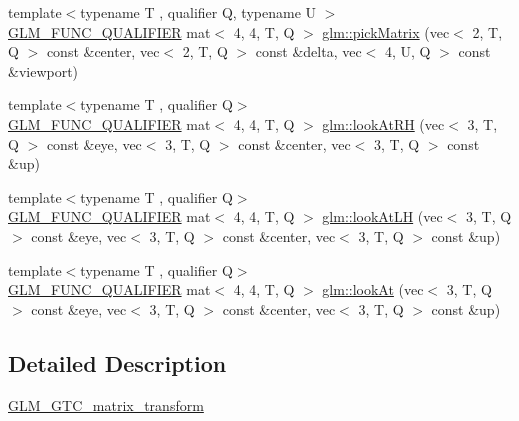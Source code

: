 \begin{DoxyCompactItemize}
\item 
{\footnotesize template$<$typename T , qualifier Q, typename U $>$ }\\\mbox{\hyperlink{setup_8hpp_a33fdea6f91c5f834105f7415e2a64407}{G\+L\+M\+\_\+\+F\+U\+N\+C\+\_\+\+Q\+U\+A\+L\+I\+F\+I\+ER}} mat$<$ 4, 4, T, Q $>$ \mbox{\hyperlink{group__gtc__matrix__transform_gaf6b21eadb7ac2ecbbe258a9a233b4c82}{glm\+::pick\+Matrix}} (vec$<$ 2, T, Q $>$ const \&center, vec$<$ 2, T, Q $>$ const \&delta, vec$<$ 4, U, Q $>$ const \&viewport)
\item 
{\footnotesize template$<$typename T , qualifier Q$>$ }\\\mbox{\hyperlink{setup_8hpp_a33fdea6f91c5f834105f7415e2a64407}{G\+L\+M\+\_\+\+F\+U\+N\+C\+\_\+\+Q\+U\+A\+L\+I\+F\+I\+ER}} mat$<$ 4, 4, T, Q $>$ \mbox{\hyperlink{group__gtc__matrix__transform_gacfa12c8889c754846bc20c65d9b5c701}{glm\+::look\+At\+RH}} (vec$<$ 3, T, Q $>$ const \&eye, vec$<$ 3, T, Q $>$ const \&center, vec$<$ 3, T, Q $>$ const \&up)
\item 
{\footnotesize template$<$typename T , qualifier Q$>$ }\\\mbox{\hyperlink{setup_8hpp_a33fdea6f91c5f834105f7415e2a64407}{G\+L\+M\+\_\+\+F\+U\+N\+C\+\_\+\+Q\+U\+A\+L\+I\+F\+I\+ER}} mat$<$ 4, 4, T, Q $>$ \mbox{\hyperlink{group__gtc__matrix__transform_gab2c09e25b0a16d3a9d89cc85bbae41b0}{glm\+::look\+At\+LH}} (vec$<$ 3, T, Q $>$ const \&eye, vec$<$ 3, T, Q $>$ const \&center, vec$<$ 3, T, Q $>$ const \&up)
\item 
{\footnotesize template$<$typename T , qualifier Q$>$ }\\\mbox{\hyperlink{setup_8hpp_a33fdea6f91c5f834105f7415e2a64407}{G\+L\+M\+\_\+\+F\+U\+N\+C\+\_\+\+Q\+U\+A\+L\+I\+F\+I\+ER}} mat$<$ 4, 4, T, Q $>$ \mbox{\hyperlink{group__gtc__matrix__transform_gaa64aa951a0e99136bba9008d2b59c78e}{glm\+::look\+At}} (vec$<$ 3, T, Q $>$ const \&eye, vec$<$ 3, T, Q $>$ const \&center, vec$<$ 3, T, Q $>$ const \&up)
\end{DoxyCompactItemize}


\subsection{Detailed Description}
\mbox{\hyperlink{group__gtc__matrix__transform}{G\+L\+M\+\_\+\+G\+T\+C\+\_\+matrix\+\_\+transform}} 